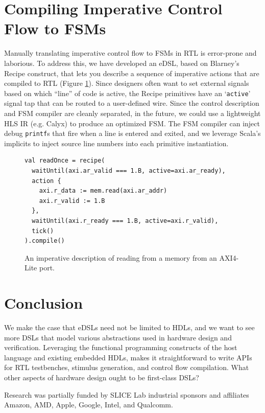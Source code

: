 \documentclass[sigplan,review,nonacm,9pt]{acmart}
\begin{document}
\section{Compiling Imperative Control Flow to FSMs}

Manually translating imperative control flow to FSMs in RTL is error-prone and laborious.
To address this, we have developed an eDSL\cite{chisel_recipes}, based on Blarney's Recipe construct\cite{blarney}, that lets you describe a sequence of imperative actions that are compiled to RTL (Figure \ref{fig:recipes}).
Since designers often want to set external signals based on which ``line'' of code is active, the Recipe primitives have an `\texttt{active}' signal tap that can be routed to a user-defined wire.
Since the control description and FSM compiler are cleanly separated, in the future, we could use a lightweight HLS IR (e.g. Calyx\cite{calyx}) to produce an optimized FSM.
The FSM compiler can inject debug \texttt{printf}s that fire when a line is entered and exited, and we leverage Scala's implicits\cite{sourcecode} to inject source line numbers into each primitive instantiation.

\begin{figure}
\begin{verbatim}
val readOnce = recipe(
  waitUntil(axi.ar_valid === 1.B, active=axi.ar_ready),
  action {
    axi.r_data := mem.read(axi.ar_addr)
    axi.r_valid := 1.B
  },
  waitUntil(axi.r_ready === 1.B, active=axi.r_valid),
  tick()
).compile()
\end{verbatim}
\caption{An imperative description of reading from a memory from an AXI4-Lite port.}
\label{fig:recipes}
\end{figure}

\section{Conclusion}


We make the case that eDSLs need not be limited to HDLs, and we want to see more DSLs that model various abstractions used in hardware design and verification.
Leveraging the functional programming constructs of the host language and existing embedded HDLs, makes it straightforward to write APIs for RTL testbenches, stimulus generation, and control flow compilation.
What other aspects of hardware design ought to be first-class DSLs?

\begin{acks}
Research was partially funded by SLICE Lab industrial sponsors and affiliates Amazon, AMD, Apple, Google, Intel, and Qualcomm.
\end{acks}




\end{document}
